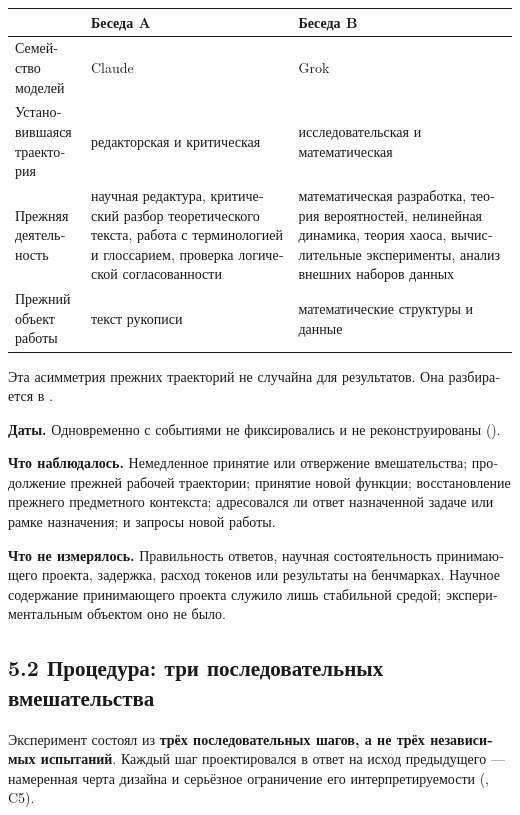 \begin{russian}
\begin{center}
\small
\begin{tabularx}{\linewidth}{>{\raggedright\arraybackslash}X>{\raggedright\arraybackslash}X>{\raggedright\arraybackslash}X}
\toprule
 & \textbf{Беседа A} & \textbf{Беседа B} \\
\midrule
Семейство моделей & Claude & Grok \\
Установившаяся траектория & редакторская и критическая & исследовательская и математическая \\
Прежняя деятельность & научная редактура, критический разбор теоретического текста, работа с терминологией и глоссарием, проверка логической согласованности & математическая разработка, теория вероятностей, нелинейная динамика, теория хаоса, вычислительные эксперименты, анализ внешних наборов данных \\
Прежний объект работы & текст рукописи & математические структуры и данные \\
\bottomrule
\end{tabularx}
\end{center}
Эта асимметрия прежних траекторий не случайна для результатов. Она разбирается в .

\textbf{Даты.} Одновременно с событиями не фиксировались и не реконструированы ().

\textbf{Что наблюдалось.} Немедленное принятие или отвержение вмешательства; продолжение прежней рабочей траектории; принятие новой функции; восстановление прежнего предметного контекста; адресовался ли ответ назначенной задаче или рамке назначения; и запросы новой работы.

\textbf{Что не измерялось.} Правильность ответов, научная состоятельность принимающего проекта, задержка, расход токенов или результаты на бенчмарках. Научное содержание принимающего проекта служило лишь стабильной средой; экспериментальным объектом оно не было.


\subsection*{5.2 Процедура: три последовательных вмешательства}
\label{sec:ru:5.2}

Эксперимент состоял из \textbf{трёх последовательных шагов, а не трёх независимых испытаний}. Каждый шаг проектировался в ответ на исход предыдущего — намеренная черта дизайна и серьёзное ограничение его интерпретируемости (, C5).



\end{russian}

